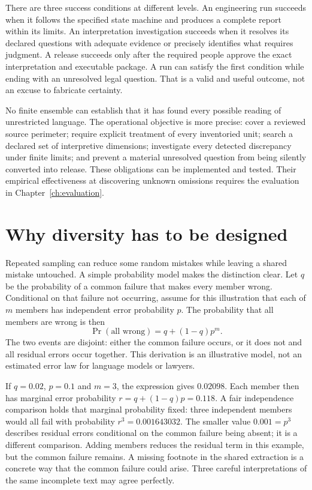 
There are three success conditions at different levels. An engineering run
succeeds when it follows the specified state machine and produces a complete
report within its limits. An interpretation investigation succeeds when it
resolves its declared questions with adequate evidence or precisely identifies
what requires judgment. A release succeeds only after the required people approve
the exact interpretation and executable package. A run can satisfy the first
condition while ending with an unresolved legal question. That is a valid and
useful outcome, not an excuse to fabricate certainty.

No finite ensemble can establish that it has found every possible reading of
unrestricted language. The operational objective is more precise: cover a
reviewed source perimeter; require explicit treatment of every inventoried unit;
search a declared set of interpretive dimensions; investigate every detected
discrepancy under finite limits; and prevent a material unresolved question from
being silently converted into release. These obligations can be implemented and
tested. Their empirical effectiveness at discovering unknown omissions requires
the evaluation in Chapter~\ref{ch:evaluation}.

\section{Why diversity has to be designed}
\label{merge:M06:01}


Repeated sampling can reduce some random mistakes while leaving a shared mistake
untouched. A simple probability model makes the distinction clear. Let $q$ be the
probability of a common failure that makes every member wrong. Conditional on
that failure not occurring, assume for this illustration that each of $m$ members
has independent error probability $p$. The probability that all members are wrong
is then
\begin{equation}
 \Pr(\text{all wrong})=q+(1-q)p^m.
 \label{eq:common-error}
\end{equation}
The two events are disjoint: either the common failure occurs, or it does not and
all residual errors occur together. This derivation is an illustrative model,
not an estimated error law for language models or lawyers.

If $q=0.02$, $p=0.1$ and $m=3$, the expression gives $0.02098$. Each
member then has marginal error probability $r=q+(1-q)p=0.118$. A fair
independence comparison holds that marginal probability fixed: three
independent members would all fail with probability $r^3=0.001643032$.
The smaller value $0.001=p^3$ describes residual errors conditional on
the common failure being absent; it is a different comparison. Adding
members reduces the residual term in this example, but the common failure
remains. A missing footnote in the shared extraction is a concrete way that the
common failure could arise. Three careful interpretations of the same incomplete
text may agree perfectly.

